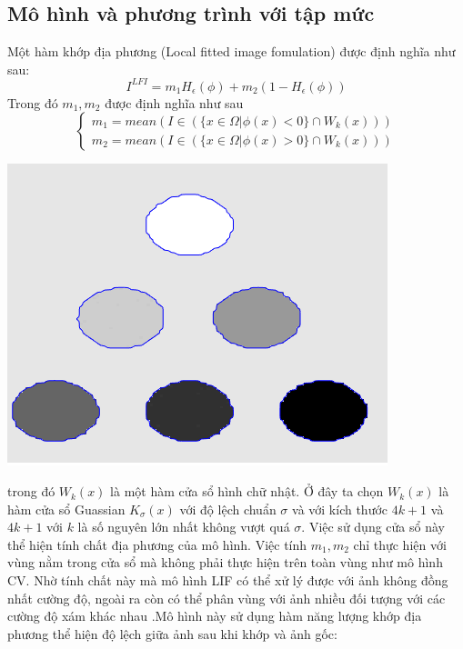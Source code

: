 \documentclass[12pt,oneside,a4]{report}
\begin{document}
\subsection{Mô hình và phương trình với tập mức}
Một hàm khớp địa phương (Local fitted image fomulation) được định nghĩa như sau:
\begin{equation}
I^{LFI}= m_1H_{\epsilon}(\phi)+m_2(1-H_{\epsilon}(\phi))
\end{equation}
Trong đó $m_1,m_2$ được định nghĩa như sau
\begin{equation}
\begin{cases}
 m_1=mean(I\in (\{x\in \Omega|\phi(x)<0\}\cap W_k(x)))\\
  m_2=mean(I\in (\{x\in \Omega|\phi(x)>0\}\cap W_k(x)))
   \end{cases}
\end{equation}
\begin{center}
\includegraphics[scale=.7]{figure/3clif1.png}
\end{center}
trong đó $W_k(x)$ là một hàm cửa sổ hình chữ nhật. Ở đây ta chọn $W_k(x)$  là hàm cửa sổ Guassian $K_{\sigma}(x)$ với độ lệch chuẩn $\sigma$ và với kích thước $4k+1$ và $4k+1$ với $k$ là số nguyên lớn nhất không vượt quá $\sigma$. Việc sử dụng cửa sổ này thể hiện tính chất địa phương của mô hình. Việc tính $m_1, m_2$ chỉ thực hiện với vùng nằm trong cửa sổ mà không phải thực hiện trên toàn vùng như mô hình CV. Nhờ tính chất này mà mô hình LIF có thể xử lý được với ảnh không đồng nhất cường độ, ngoài ra còn có thể phân vùng với ảnh nhiều đối tượng với các cường độ xám khác nhau .Mô hình này sử dụng hàm năng lượng khớp địa phương thể hiện độ lệch giữa ảnh sau khi khớp và ảnh gốc:
\end{document}
